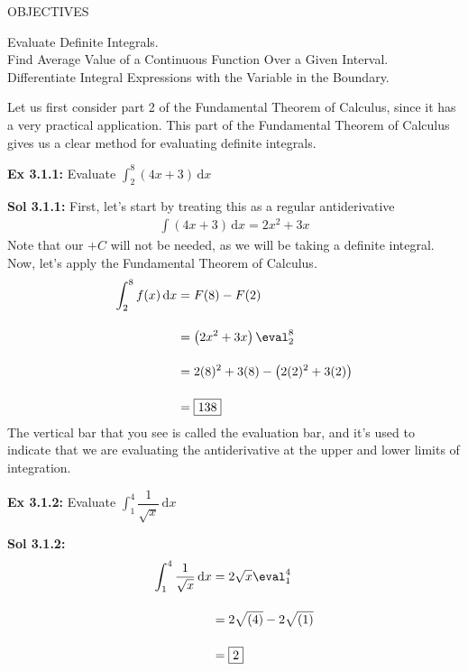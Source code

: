 \begin{tcolorbox}[objective]
    \begin{center}
        OBJECTIVES \\[11pt]
    \end{center}
    Evaluate Definite Integrals. \\
    Find Average Value of a Continuous Function Over a Given Interval. \\
    Differentiate Integral Expressions with the Variable in the Boundary.
\end{tcolorbox}

Let us first consider part 2 of the Fundamental Theorem of Calculus, since it has a very practical application. This part of the Fundamental Theorem of Calculus gives us a clear method for evaluating definite integrals. \par

\begin{tcolorbox}[example]
    \textbf{Ex 3.1.1: } Evaluate $\int_2^8 (4x + 3) \,\mathrm{d}x$
\end{tcolorbox}
\begin{tcolorbox}[solution]
    \textbf{Sol 3.1.1: } First, let's start by treating this as a regular antiderivative \begin{align*}
        \int (4x + 3) \,\mathrm{d}x = 2x^2 + 3x
    \end{align*}
    Note that our $+C$ will not be needed, as we will be taking a definite integral. Now, let's apply the Fundamental Theorem of Calculus. \begin{align*}
        \int_2^8 f(x) \,\mathrm{d}x &= F(8) - F(2) \\[11pt]
        & = \left(2x^2 + 3x\right) \eval_2^8 \\[11pt]
        & = 2(8)^2 + 3(8) - \left(2(2)^2 + 3(2)\right) \\[11pt]
        & = \boxed{138}
    \end{align*}
    The vertical bar that you see is called the evaluation bar, and it's used to indicate that we are evaluating the antiderivative at the upper and lower limits of integration.
\end{tcolorbox} \vspace{11pt}

\begin{tcolorbox}[example]
    \textbf{Ex 3.1.2: } Evaluate $\int_1^4 \dfrac{1}{\sqrt{x}} \,\mathrm{d}x$ 
\end{tcolorbox}
\begin{tcolorbox}[solution]
    \textbf{Sol 3.1.2: } \begin{align*}
        \int_1^4 \dfrac{1}{\sqrt{x}} \,\mathrm{d}x &= 2\sqrt{x} \eval_1^4 \\[11pt]
        & = 2\sqrt{(4)} - 2\sqrt{(1)} \\[11pt]
        & = \boxed{2}
    \end{align*}
\end{tcolorbox} \vspace{11pt}

